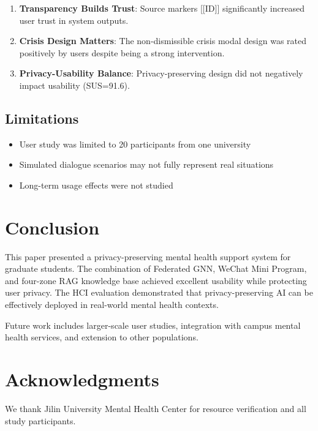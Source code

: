 \documentclass[preprint,12pt]{elsarticle}
\begin{document}
\begin{enumerate}
    \item \textbf{Transparency Builds Trust}: Source markers [[ID]] significantly
          increased user trust in system outputs.

    \item \textbf{Crisis Design Matters}: The non-dismissible crisis modal design
          was rated positively by users despite being a strong intervention.

    \item \textbf{Privacy-Usability Balance}: Privacy-preserving design did not
          negatively impact usability (SUS=91.6).
\end{enumerate}

\subsection{Limitations}

\begin{itemize}
    \item User study was limited to 20 participants from one university
    \item Simulated dialogue scenarios may not fully represent real situations
    \item Long-term usage effects were not studied
\end{itemize}

\section{Conclusion}

This paper presented a privacy-preserving mental health support system for
graduate students. The combination of Federated GNN, WeChat Mini Program,
and four-zone RAG knowledge base achieved excellent usability while protecting
user privacy. The HCI evaluation demonstrated that privacy-preserving AI can
be effectively deployed in real-world mental health contexts.

Future work includes larger-scale user studies, integration with campus mental
health services, and extension to other populations.

\section*{Acknowledgments}

We thank Jilin University Mental Health Center for resource verification and
all study participants.



\end{document}
